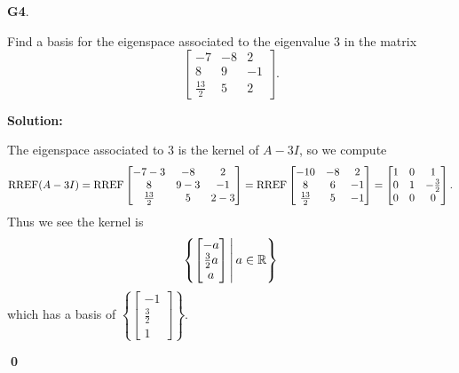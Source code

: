 \documentclass{article}
\newenvironment{problem}[1]
{
  \begin{flushleft}
  \textbf{#1}.
  \ignorespaces
}
{
  \end{flushleft}
}
\newenvironment{solution}
{
  \ignorespaces
  \textbf{Solution:}
}
{
  \ignorespacesafterend
  \begin{flushright}
  {\bfseries \qed}
  \end{flushright}
}
\begin{document}
\begin{problem}{G4}
Find a basis for the eigenspace associated to the eigenvalue $3$ in the matrix \[\begin{bmatrix} -7 & -8 & 2 \\ 8 & 9 & -1 \\ \frac{13}{2} & 5 & 2 \end{bmatrix}.\]
\end{problem}
\begin{solution}
The eigenspace associated to $3$ is the kernel of $A-3I$, so we compute
\[\operatorname{RREF}(A-3I) = \operatorname{RREF} \begin{bmatrix} -7-3 & -8 & 2 \\ 8 & 9-3 & -1 \\ \frac{13}{2} & 5 & 2-3 \end{bmatrix} = \operatorname{RREF} \begin{bmatrix} -10 & -8 & 2 \\ 8 & 6 & -1 \\ \frac{13}{2} & 5 & -1 \end{bmatrix} = \begin{bmatrix} 1 & 0 & 1 \\ 0 & 1 & -\frac{3}{2} \\ 0 & 0 & 0 \end{bmatrix}.\]
Thus we see the kernel is \[\left\{\begin{bmatrix} -a \\ \frac{3}{2} a \\ a \end{bmatrix}\,\middle|\,a \in \mathbb{R}\right\}\]
which has a basis of \(\left\{ \begin{bmatrix} -1 \\ \frac{3}{2} \\ 1 \end{bmatrix} \right\}\).
\end{solution}
\end{document}
